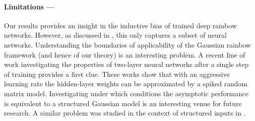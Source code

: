\paragraph{Limitations ---} Our results provides an insight in the inductive bias of trained deep rainbow networks. However, as discussed in \cite{guth2023rainbow}, this only captures a subset of neural networks. Understanding the boundaries of applicability of the Gaussian rainbow framework (and hence of our theory) is an interesting problem. A recent line of work investigating the properties of two-layer neural networks after a single step of training \cite{Ba2022, dandi2023twolayer, moniri2024theory, cui2024asymptotics} provides a first clue. These works show that with an aggressive learning rate the hidden-layer weights can be approximated by a spiked random matrix model. Investigating under which conditions the asymptotic performance is equivalent to a structured Gaussian model is an interesting venue for future research. A similar problem was studied in the context of structured inputs in \cite{pesce23a, Gerace2024}.